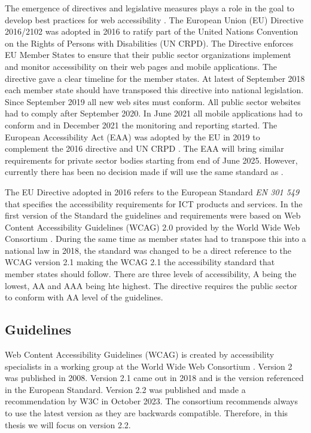 The emergence of directives and legislative measures plays a role in the goal to develop best practices for web accessibility \citep{eudirective2016}. The European Union (EU) Directive 2016/2102 was adopted in 2016 to ratify part of the United Nations Convention on the Rights of Persons with Disabilities (UN CRPD). The Directive enforces EU Member States to ensure that their public sector organizations implement and monitor accessibility on their web pages and mobile applications. The directive gave a clear timeline for the member states. At latest of September 2018 each member state should have transposed this directive into national legislation. Since September 2019 all new web sites must conform. All public sector websites had to comply after September 2020. In June 2021 all mobile applications had to conform and in December 2021 the monitoring and reporting started. The European Accessibility Act (EAA) was adopted by the EU in 2019 to complement the 2016 directive and UN CRPD \citep{eudirective2019}. The EAA will bring similar requirements for private sector bodies starting from end of June 2025. However, currently there has been no decision made if \cite{eudirective2019} will use the same standard as \cite{eudirective2016}.

The EU Directive adopted in 2016 refers to the European Standard \textit{EN 301 549} that specifies the accessibility requirements for ICT products and services. In the first version of the Standard the guidelines and requirements were based on Web Content Accessibility Guidelines (WCAG) 2.0 provided by the World Wide Web Consortium \citep{wcagadoptioneurope}. During the same time as member states had to transpose this into a national law in 2018, the standard was changed to be a direct reference to the WCAG version 2.1 making the WCAG 2.1 the accessibility standard that member states should follow. There are three levels of accessibility, A being the lowest, AA and AAA being hte highest. The directive requires the public sector to conform with AA level of the guidelines.


\subsection{Guidelines}

Web Content Accessibility Guidelines (WCAG) is created by accessibility specialists in a working group at the World Wide Web Consortium \citep{wcagoverview}. Version 2 was published in 2008. Version 2.1 came out in 2018 and is the version referenced in the European Standard. Version 2.2 was published and made a recommendation by W3C in October 2023. The consortium recommends always to use the latest version as they are backwards compatible. Therefore, in this thesis we will focus on version 2.2.

